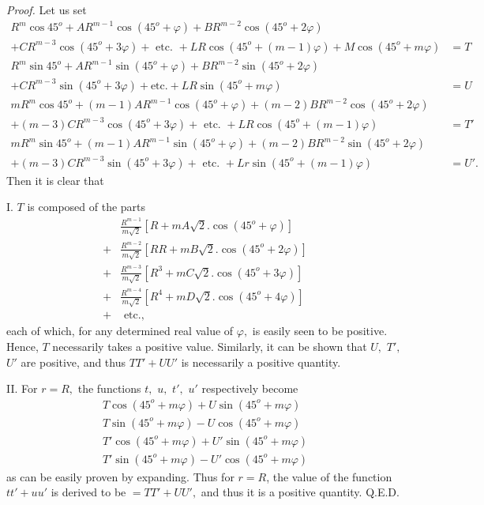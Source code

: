 \documentclass[14pt]{memoir}
\theoremstyle{plain}
\theoremstyle{remark}
\begin{document}
\textit{Proof.} Let us set
\begin{align*}
R^m\cos 45^o + A R^{m-1}\cos(45^o+\varphi)+BR^{m-2}\cos(45^o+2\varphi) &\\
+CR^{m-3}\cos(45^o+3\varphi)+\text{ etc. }+LR\cos(45^o+(m-1)\varphi)+M\cos(45^o+m\varphi) &= T\\
R^m\sin45^o+AR^{m-1}\sin(45^o+\varphi)+BR^{m-2}\sin(45^o+2\varphi)&\\
+CR^{m-3}\sin(45^o+3\varphi)+\text{etc.}+LR\sin(45^o+m\varphi)&= U \\
mR^m\cos 45^o +(m-1)AR^{m-1}\cos(45^o+\varphi)+(m-2)BR^{m-2}\cos(45^o+2\varphi)&\\
+(m-3)CR^{m-3}\cos(45^o+3\varphi)+\text{ etc. }+LR\cos(45^o+(m-1)\varphi) &= T'\\
mR^m\sin45^o +(m-1)AR^{m-1}\sin(45^o+\varphi) + (m-2)BR^{m-2}\sin(45^o+2\varphi)&\\
+(m-3)CR^{m-3}\sin(45^o+3\varphi)+\text{ etc. }+Lr\sin(45^o+(m-1)\varphi) &= U'.\end{align*}
Then it is clear that

I. \(T\) is composed of the parts
\begin{align*}
&\frac{R^{m-1}}{m\sqrt{2}}\left[R+mA\sqrt{2}.\cos(45^o+\varphi)\right]\\
+&\frac{R^{m-2}}{m\sqrt{2}}\left[RR+mB\sqrt{2}.\cos(45^o+2\varphi)\right]\\
+&\frac{R^{m-3}}{m\sqrt{2}}\left[R^3+mC\sqrt{2}.\cos(45^o+3\varphi)\right]\\
+&\frac{R^{m-4}}{m\sqrt{2}}\left[R^4+mD\sqrt{2}.\cos(45^o+4\varphi)\right]\\
+&\text{ etc.,} 
\end{align*}
each of which, for any determined real value of \(\varphi,\) is easily seen to be positive.  Hence, \(T\) necessarily takes a positive value. Similarly, it can be shown that \(U,\) \(T',\) \(U'\) are positive, and thus \(TT'+UU'\) is necessarily a positive quantity.

II. For \(r=R,\) the functions \(t,\) \(u,\) \(t',\) \(u'\) respectively become
\[\begin{array}{c}
T\cos(45^o+m\varphi)+U\sin(45^o+m\varphi)\\
T\sin(45^o+m\varphi)-U\cos(45^o+m\varphi)\\
T'\cos(45^o+m\varphi)+U'\sin(45^o+m\varphi)\\
T'\sin(45^o+m\varphi)-U'\cos(45^o+m\varphi)\end{array}\]
as can be easily proven by expanding. Thus for \(r=R\), the value of the function \(tt'+uu'\)  is derived to be \(=TT'+UU',\) and thus it is a positive quantity. Q.E.D.
\end{document}
